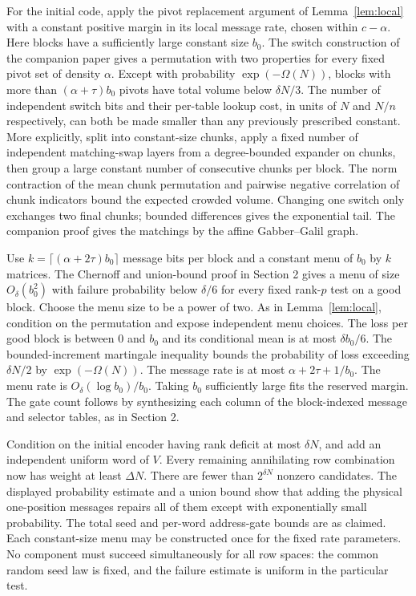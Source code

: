 For the initial code, apply the pivot replacement argument of Lemma~\ref{lem:local} with a constant positive margin in its local message rate, chosen within $c-\alpha$. Here blocks have a sufficiently large constant size $b_0$. The switch construction of the companion paper gives a permutation with two properties for every fixed pivot set of density $\alpha$. Except with probability $\exp(-\Omega(N))$, blocks with more than $(\alpha+\tau)b_0$ pivots have total volume below $\delta N/3$. The number of independent switch bits and their per-table lookup cost, in units of $N$ and $N/n$ respectively, can both be made smaller than any previously prescribed constant. More explicitly, split into constant-size chunks, apply a fixed number of independent matching-swap layers from a degree-bounded expander on chunks, then group a large constant number of consecutive chunks per block. The norm contraction of the mean chunk permutation and pairwise negative correlation of chunk indicators bound the expected crowded volume. Changing one switch only exchanges two final chunks; bounded differences gives the exponential tail. The companion proof gives the matchings by the affine Gabber--Galil graph.

Use $k=\lceil(\alpha+2\tau)b_0\rceil$ message bits per block and a constant menu of $b_0$ by $k$ matrices. The Chernoff and union-bound proof in Section 2 gives a menu of size $O_\delta(b_0^2)$ with failure probability below $\delta/6$ for every fixed rank-$p$ test on a good block. Choose the menu size to be a power of two. As in Lemma~\ref{lem:local}, condition on the permutation and expose independent menu choices. The loss per good block is between $0$ and $b_0$ and its conditional mean is at most $\delta b_0/6$. The bounded-increment martingale inequality bounds the probability of loss exceeding $\delta N/2$ by $\exp(-\Omega(N))$. The message rate is at most $\alpha+2\tau+1/b_0$. The menu rate is $O_\delta(\log b_0)/b_0$. Taking $b_0$ sufficiently large fits the reserved margin. The gate count follows by synthesizing each column of the block-indexed message and selector tables, as in Section 2.

Condition on the initial encoder having rank deficit at most $\delta N$, and add an independent uniform word of $V$. Every remaining annihilating row combination now has weight at least $\Delta N$. There are fewer than $2^{\delta N}$ nonzero candidates. The displayed probability estimate and a union bound show that adding the physical one-position messages repairs all of them except with exponentially small probability. The total seed and per-word address-gate bounds are as claimed. Each constant-size menu may be constructed once for the fixed rate parameters. No component must succeed simultaneously for all row spaces: the common random seed law is fixed, and the failure estimate is uniform in the particular test.
